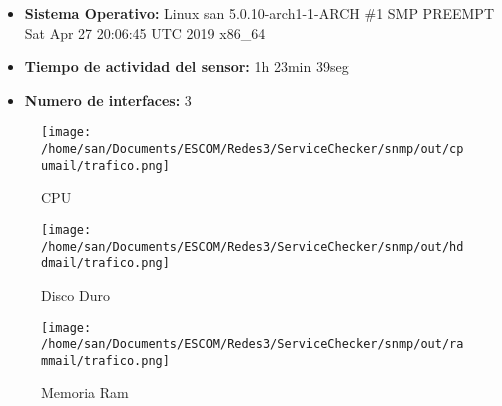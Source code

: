 \begin{itemize}
\item \textbf{Sistema Operativo:}  Linux san 5.0.10-arch1-1-ARCH \#1 SMP PREEMPT Sat Apr 27 20:06:45 UTC 2019 x86\_64
\item \textbf{Tiempo de actividad del sensor:} 1h 23min 39seg
\item \textbf{Numero de interfaces:} 3
\end{itemize}
\begin{figure}[!htb]
\texttt{[image: /home/san/Documents/ESCOM/Redes3/ServiceChecker/snmp/out/cpumail/trafico.png]}
\caption{CPU}
\endminipage\hfill
{}
\texttt{[image: /home/san/Documents/ESCOM/Redes3/ServiceChecker/snmp/out/hddmail/trafico.png]}
\caption{Disco Duro}
\endminipage\hfill
{}%
\texttt{[image: /home/san/Documents/ESCOM/Redes3/ServiceChecker/snmp/out/rammail/trafico.png]}
\caption{Memoria Ram}
\endminipage
\end{figure}
\FloatBarrier
